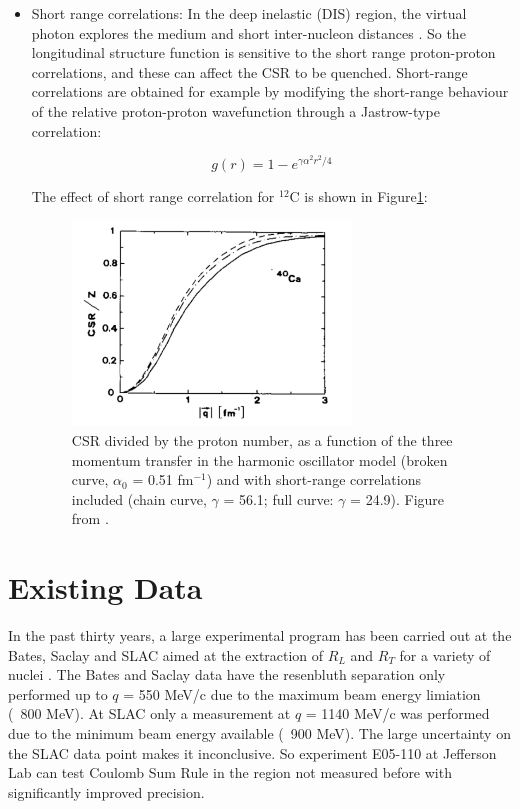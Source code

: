 \begin{itemize}
\item Short range correlations:
In the deep inelastic (DIS) region, the virtual photon explores the medium and short inter-nucleon distances \cite{Orlandini1991}.
So the longitudinal structure function is sensitive to the short range proton-proton correlations, and these can affect
the CSR to be quenched. Short-range correlations are obtained for example by modifying the
short-range behaviour of the relative proton-proton wavefunction through a Jastrow-type correlation:

\begin{equation}
g(r) = 1 - e^{\gamma \alpha^2 r^2/4}
\end{equation}

The effect of short range correlation for $^{12}$C is shown in Figure\ref{fig:short_range_data}:

\begin{figure}[h]
\centering
\includegraphics[width=0.7\textwidth]{figs/short_range_data.png}
\caption[short range data]{CSR divided by the proton number, as a function of the three momentum transfer in the 
harmonic oscillator model (broken curve, $\alpha_0$ = 0.51 fm$^{-1}$) and with short-range correlations included
(chain curve, $\gamma$ = 56.1; full curve: $\gamma$ = 24.9).
 Figure from \cite{Orlandini1991}.
\label{fig:short_range_data}}
\end{figure}

\end{itemize}

\section{Existing Data}
In the past thirty years, a large experimental program has been carried out at the Bates, Saclay and SLAC
aimed at the extraction of $R_L$ and $R_T$ for a variety of nuclei \cite{Meziani2001}.
The Bates and Saclay data have the resenbluth separation only performed up to $q$ = 550 MeV/c due to the maximum beam
energy limiation (~800 MeV). At SLAC only a measurement at $q$ = 1140 MeV/c was performed due to the minimum beam energy
available (~900 MeV). The large uncertainty on the SLAC data point makes it inconclusive. So experiment E05-110 at
Jefferson Lab can test Coulomb Sum Rule in the region not measured before with significantly improved precision.

